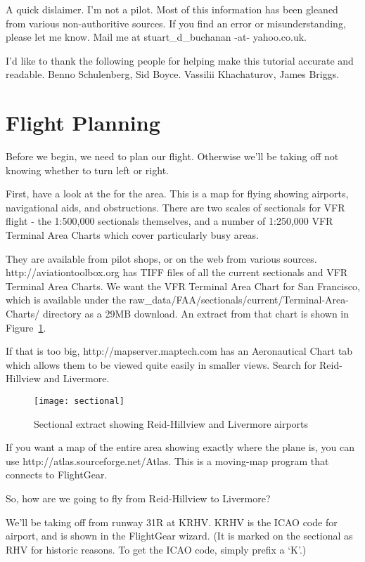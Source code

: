 A quick dislaimer. I'm not a pilot. Most of this information has been gleaned from various non-authoritive sources. If you find an error or misunderstanding, please let me know. Mail me at stuart\_d\_buchanan -at- yahoo.co.uk.

I'd like to thank the following people for helping make this tutorial accurate and readable. Benno Schulenberg, Sid Boyce. Vassilii Khachaturov, James Briggs.

\section{Flight Planning}

Before we begin, we need to plan our flight. Otherwise we'll be taking off not knowing whether to turn left or right.

First, have a look at the  for the area. This is a map for flying showing airports, navigational aids, and obstructions. There are two scales of sectionals for VFR flight - the 1:500,000 sectionals themselves, and a number of 1:250,000 VFR Terminal Area Charts which cover particularly busy areas.

They are available from pilot shops, or on the web from various sources. http://aviationtoolbox.org has TIFF files of all the current sectionals and VFR Terminal Area Charts. We want the VFR Terminal Area Chart for San Francisco, which is available under the raw\_data/FAA/sectionals/current/Terminal-Area-Charts/ directory as a 29MB download. An extract from that chart is shown in Figure~\ref{sectional}.

If that is too big, http://mapserver.maptech.com has an Aeronautical Chart tab which allows them to be viewed quite easily in smaller views. Search for Reid-Hillview and Livermore.

\begin{figure}[!htp]
\centering
\texttt{[image: sectional]}
\caption{Sectional extract showing Reid-Hillview and Livermore airports\label{sectional}}
\end{figure}

If you want a map of the entire area showing exactly where the plane is, you can use http://atlas.sourceforge.net/Atlas. This is a moving-map program that connects to FlightGear.

So, how are we going to fly from Reid-Hillview to Livermore?

We'll be taking off from runway 31R at KRHV. KRHV is the ICAO code for  airport, and is shown in the FlightGear wizard. (It is marked on the sectional as RHV for historic reasons. To get the ICAO code, simply prefix a `K'.)

